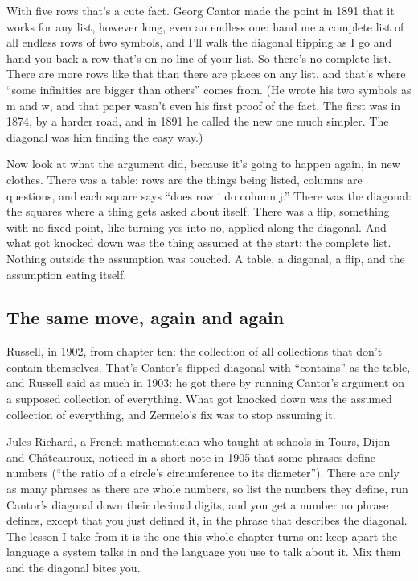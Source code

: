 \documentclass[11pt,twoside]{article}
\theoremstyle{thielethm}
\theoremstyle{thieledef}
\theoremstyle{thieledef}
\theoremstyle{thieledef}
\theoremstyle{thielethm}
\theoremstyle{thieleobs}
\theoremstyle{thielethm}
\begin{document}
With five rows that's a cute fact. Georg Cantor made the point in 1891 that it works for any list, however long, even an endless one: hand me a complete list of all endless rows of two symbols, and I'll walk the diagonal flipping as I go and hand you back a row that's on no line of your list. So there's no complete list. There are more rows like that than there are places on any list, and that's where ``some infinities are bigger than others'' comes from. (He wrote his two symbols as m and w, and that paper wasn't even his first proof of the fact. The first was in 1874, by a harder road, and in 1891 he called the new one much simpler. The diagonal was him finding the easy way.)

Now look at what the argument did, because it's going to happen again, in new clothes. There was a table: rows are the things being listed, columns are questions, and each square says ``does row i do column j.'' There was the diagonal: the squares where a thing gets asked about itself. There was a flip, something with no fixed point, like turning yes into no, applied along the diagonal. And what got knocked down was the thing assumed at the start: the complete list. Nothing outside the assumption was touched. A table, a diagonal, a flip, and the assumption eating itself.

\subsection{The same move, again and again}

Russell, in 1902, from chapter ten: the collection of all collections that don't contain themselves. That's Cantor's flipped diagonal with ``contains'' as the table, and Russell said as much in 1903: he got there by running Cantor's argument on a supposed collection of everything. What got knocked down was the assumed collection of everything, and Zermelo's fix was to stop assuming it.

Jules Richard, a French mathematician who taught at schools in Tours, Dijon and Châteauroux, noticed in a short note in 1905 that some phrases define numbers (``the ratio of a circle's circumference to its diameter''). There are only as many phrases as there are whole numbers, so list the numbers they define, run Cantor's diagonal down their decimal digits, and you get a number no phrase defines, except that you just defined it, in the phrase that describes the diagonal. The lesson I take from it is the one this whole chapter turns on: keep apart the language a system talks in and the language you use to talk about it. Mix them and the diagonal bites you.
\end{document}
